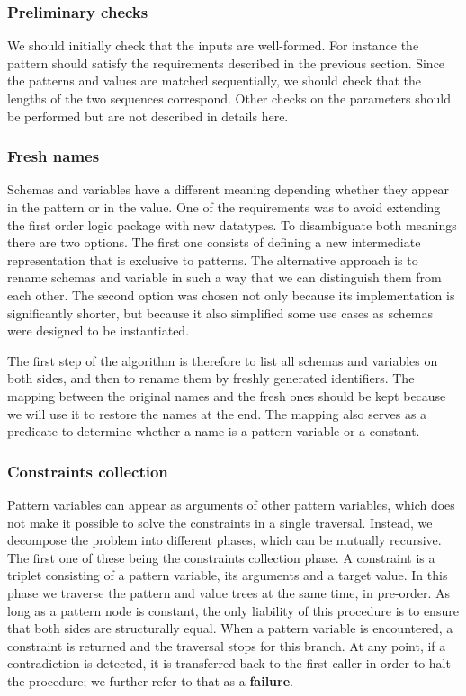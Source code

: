 \subsubsection{Preliminary checks}

We should initially check that the inputs are well-formed. For instance the pattern should satisfy the requirements described in the previous section. Since the patterns and values are matched sequentially, we should check that the lengths of the two sequences correspond. Other checks on the parameters should be performed but are not described in details here.

\subsubsection{Fresh names}

Schemas and variables have a different meaning depending whether they appear in the pattern or in the value. One of the requirements was to avoid extending the first order logic package with new datatypes. To disambiguate both meanings there are two options. The first one consists of defining a new intermediate representation that is exclusive to patterns. The alternative approach is to rename schemas and variable in such a way that we can distinguish them from each other. The second option was chosen not only because its implementation is significantly shorter, but because it also simplified some use cases as schemas were designed to be instantiated.

The first step of the algorithm is therefore to list all schemas and variables on both sides, and then to rename them by freshly generated identifiers. The mapping between the original names and the fresh ones should be kept because we will use it to restore the names at the end. The mapping also serves as a predicate to determine whether a name is a pattern variable or a constant.

\subsubsection{Constraints collection}

Pattern variables can appear as arguments of other pattern variables, which does not make it possible to solve the constraints in a single traversal. Instead, we decompose the problem into different phases, which can be mutually recursive. The first one of these being the constraints collection phase. A constraint is a triplet consisting of a pattern variable, its arguments and a target value. In this phase we traverse the pattern and value trees at the same time, in pre-order. As long as a pattern node is constant, the only liability of this procedure is to ensure that both sides are structurally equal. When a pattern variable is encountered, a constraint is returned and the traversal stops for this branch. At any point, if a contradiction is detected, it is transferred back to the first caller in order to halt the procedure; we further refer to that as a \textbf{failure}.

